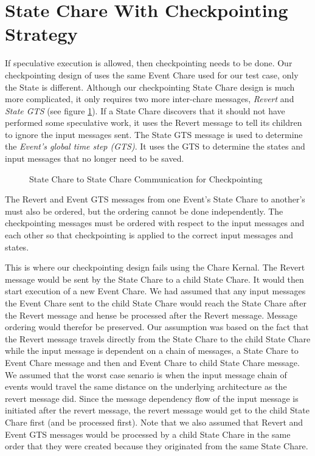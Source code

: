 \section{State Chare With Checkpointing Strategy}


If speculative execution is allowed, then checkpointing needs to be
done.  Our checkpointing design of \dispare uses the same Event Chare
used for our test case, only the State is different.  Although our
checkpointing State Chare design is much more complicated, it only
requires two more inter-chare messages, {\em Revert} and {\em State GTS}
(see figure \ref{figstatestate}).  If a State Chare discovers that it
should not have performed some speculative work, it uses the Revert
message to tell its children to ignore the input messages sent.  The
State GTS message is used to determine the {\em Event's global time step
(GTS)}.  It uses the GTS to determine the states and input messages that
no longer need to be saved.

\begin{figure}
\label{figstatestate}
\centerline{}
\caption{State Chare to State Chare Communication for Checkpointing}
\end{figure}

The Revert and Event GTS messages from one Event's State Chare to
another's must also be ordered, but the ordering
cannot be done independently.  The checkpointing messages must be
ordered with respect to the input messages and each other so that
checkpointing is applied to the correct input messages and states.

This is where our checkpointing design fails using the Chare
Kernal.  The Revert message would be sent by the State Chare to a
child State Chare.  It would then start execution of a new Event
Chare.  We had assumed that any input messages the Event Chare sent to
the child State Chare would reach the State Chare after the Revert
message and hense be processed after the Revert message.  Message
ordering would therefor be preserved.  Our assumption was based on the
fact that the Revert message travels directly from the State Chare to
the child State Chare while the input message is dependent on a chain
of messages, a State Chare to Event Chare message and then and Event
Chare to child State Chare message.  We assumed that the worst case
senario is when the input message chain of events would travel the
same distance on the underlying architecture as the revert message
did.  Since the message dependency flow of the input message is
initiated after the revert message, the revert message would get to
the child State Chare first (and be processed first).  Note that we
also assumed that Revert and Event GTS messages would be processed by
a child State Chare in the same order that they were created because
they originated from the same State Chare.

